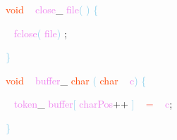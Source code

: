 \documentclass[10, usernames, dvipsnames]{beamer}
\begin{document}
\begin{frame}

 
 \textcolor{OrangeRed}{void}
\textcolor{White}{\ }
\textcolor{Violet}{close}\textcolor{Sepia}{\_}
\textcolor{Violet}{file}\textcolor{SkyBlue}{(}
\textcolor{SkyBlue}{)}
\textcolor{SkyBlue}{\{ }

 \textcolor{White}{\   }
\textcolor{Violet}{fclose}\textcolor{SkyBlue}{(}
\textcolor{Violet}{file}\textcolor{SkyBlue}{)}
\textcolor{Sepia}{;}

 \textcolor{SkyBlue}{\} }

 
 \textcolor{OrangeRed}{void}
\textcolor{White}{\ }
\textcolor{Violet}{buffer}\textcolor{Sepia}{\_}
\textcolor{OrangeRed}{char}
\textcolor{SkyBlue}{(}
\textcolor{OrangeRed}{char}
\textcolor{White}{\ }
\textcolor{Violet}{c}\textcolor{SkyBlue}{)}
\textcolor{SkyBlue}{\{ }

 \textcolor{White}{\   }
\textcolor{Violet}{token}\textcolor{Sepia}{\_}
\textcolor{Violet}{buffer}\textcolor{SkyBlue}{[}
\textcolor{Violet}{charPos}\textcolor{Apricot}{++}
\textcolor{SkyBlue}{]}
\textcolor{White}{\ }
\textcolor{Salmon}{=}
\textcolor{White}{\ }
\textcolor{Violet}{c}\textcolor{Sepia}{;}

 \textcolor{SkyBlue}{\} }

 
 \end{frame}
\end{document}
